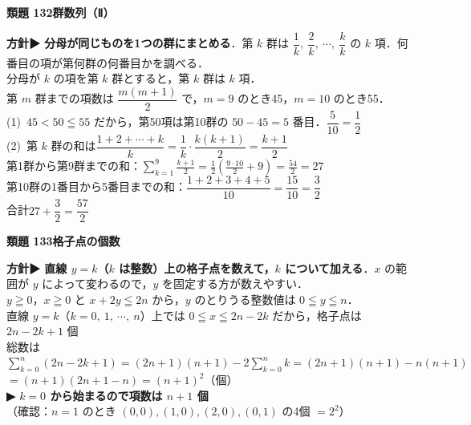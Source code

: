 \documentclass[a4paper,11pt]{ltjsarticle}
\newcommand{\ans}[2]{\Needspace{5\baselineskip}\vspace{6pt}%
  {\sffamily\bfseries 類題 #1\quad #2}\par}
\newcommand{\point}[1]{\textsf{\bfseries ▶ #1}}
\begin{document}
\ans{132}{群数列（Ⅱ）}
\begin{kai}
\textbf{方針}\quad \point{分母が同じものを1つの群にまとめる}．第 $k$ 群は $\dfrac1k,\ \dfrac2k,\ \cdots,\ \dfrac kk$ の $k$ 項．何番目の項が第何群の何番目かを調べる．\\[2pt]
分母が $k$ の項を第 $k$ 群とすると，第 $k$ 群は $k$ 項．\\
第 $m$ 群までの項数は $\dfrac{m(m+1)}2$ で，$m=9$ のとき45，$m=10$ のとき55．\\[2pt]
(1)\ $45<50\leqq55$ だから，第50項は第10群の $50-45=5$ 番目．\quad $\dfrac5{10}=\dfrac12$\\[2pt]
(2)\ 第 $k$ 群の和は\quad $\dfrac{1+2+\cdots+k}{k}=\dfrac{1}{k}\cdot\dfrac{k(k+1)}2=\dfrac{k+1}2$\\
\hspace*{1.5em}第1群から第9群までの和：$\displaystyle\sum_{k=1}^9\frac{k+1}2=\frac12\left(\frac{9\cdot10}2+9\right)=\frac{54}2=27$\\
\hspace*{1.5em}第10群の1番目から5番目までの和：$\dfrac{1+2+3+4+5}{10}=\dfrac{15}{10}=\dfrac32$\\
\hspace*{1.5em}合計\quad $27+\dfrac32=\dfrac{57}2$
\end{kai}

\ans{133}{格子点の個数}
\begin{kai}
\textbf{方針}\quad \point{直線 $y=k$（$k$ は整数）上の格子点を数えて，$k$ について加える}．$x$ の範囲が $y$ によって変わるので，$y$ を固定する方が数えやすい．\\[2pt]
$y\geqq0$，$x\geqq0$ と $x+2y\leqq2n$ から，$y$ のとりうる整数値は $0\leqq y\leqq n$．\\
直線 $y=k$（$k=0,\ 1,\ \cdots,\ n$）上では $0\leqq x\leqq2n-2k$ だから，格子点は\quad $2n-2k+1$ 個\\[2pt]
総数は\\
\hspace*{1.5em}$\displaystyle\sum_{k=0}^n(2n-2k+1)=(2n+1)(n+1)-2\sum_{k=0}^nk=(2n+1)(n+1)-n(n+1)$\\
\hspace*{1.5em}$=(n+1)(2n+1-n)=(n+1)^2$（個）\\
\point{$k=0$ から始まるので項数は $n+1$ 個}\\
（確認：$n=1$ のとき $(0,0),(1,0),(2,0),(0,1)$ の4個 $=2^2$）
\end{kai}
\end{document}
